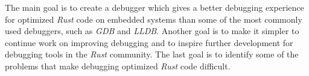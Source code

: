 The main goal is to create a debugger which gives a better debugging experience for optimized \emph{Rust} code on embedded systems than some of the most commonly used debuggers, such as \emph{GDB} and \emph{LLDB}.
Another goal is to make it simpler to continue work on improving debugging and to inspire further development for debugging tools in the \emph{Rust} community.
The last goal is to identify some of the problems that make debugging optimized \emph{Rust} code difficult.


%
%
%
%




